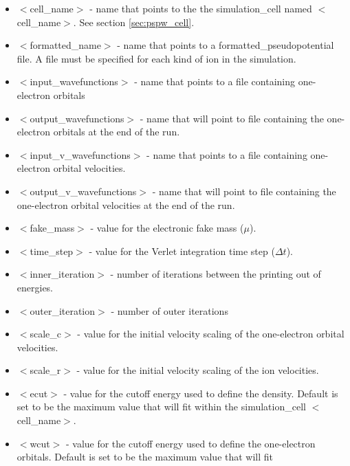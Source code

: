 \begin{itemize}
        \item $<$cell\_name$>$ - name that points to the
              the simulation\_cell named $<$cell\_name$>$.  See section \ref{sec:pspw_cell}.
        \item $<$formatted\_name$>$ - name that points
              to a formatted\_pseudopotential file.  A file must
              be specified for each kind of ion in the simulation.
        \item $<$input\_wavefunctions$>$ - name that points
              to a file containing one-electron orbitals
        \item $<$output\_wavefunctions$>$ - name that will
              point to file containing the one-electron orbitals at the
              end of the run. 
        \item $<$input\_v\_wavefunctions$>$ - name that points
              to a file containing one-electron orbital velocities.
        \item $<$output\_v\_wavefunctions$>$ - name that will
              point to file containing the one-electron orbital velocities
              at the end of the run. 
        \item $<$fake\_mass$>$ - value for the electronic
              fake mass ($\mu$).
        \item $<$time\_step$>$ - value for the Verlet integration 
               time step ($\Delta t$).
        \item $<$inner\_iteration$>$ - number of iterations between the
              printing out of energies.
        \item $<$outer\_iteration$>$ - number of outer iterations
        \item $<$scale\_c$>$ - value for the initial velocity
                              scaling of the one-electron orbital velocities.
        \item $<$scale\_r$>$ - value for the initial velocity
                              scaling of the ion velocities.
        \item $<$ecut$>$ - value for the cutoff energy used
                           to define the density.  Default is set
                           to be the maximum value that will fit
                           within the simulation\_cell $<$cell\_name$>$.
        \item $<$wcut$>$ - value for the cutoff energy used
                           to define the one-electron orbitals.  Default is set
                           to be the maximum value that will fit

\end{itemize}
